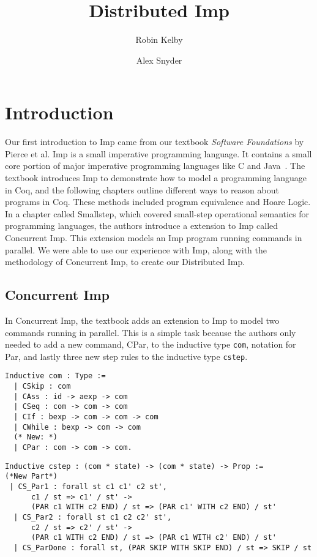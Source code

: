 \documentclass{llncs}
\begin{document}
\title{Distributed Imp}

\author{Robin Kelby \and Alex Snyder}

\maketitle

\section{Introduction}
Our first introduction to Imp came from our textbook \textit{Software Foundations} by Pierce et al. Imp is a small imperative programming language. It contains a small core portion of major imperative programming languages like C and Java~\cite{pierce2016imp}. The textbook introduces Imp to demonstrate how to model a programming language in Coq, and the following chapters outline different ways to reason about programs in Coq. These methods included program equivalence and Hoare Logic. In a chapter called Smallstep, which covered small-step operational semantics for programming languages, the authors introduce a extension to Imp called Concurrent Imp. This extension models an Imp program running commands in parallel. We were able to use our experience with Imp, along with the methodology of Concurrent Imp, to create our Distributed Imp.

\subsection{Concurrent Imp} 
In Concurrent Imp, the textbook adds an extension to Imp to model two commands running in parallel. This is a simple task because the authors only needed to add a new command, CPar, to the inductive type \lstinline|com|, notation for Par, and lastly three new step rules to the inductive type \lstinline|cstep|.  

\begin{lstlisting}
Inductive com : Type :=
  | CSkip : com
  | CAss : id -> aexp -> com
  | CSeq : com -> com -> com
  | CIf : bexp -> com -> com -> com
  | CWhile : bexp -> com -> com
  (* New: *)
  | CPar : com -> com -> com.
\end{lstlisting}

\begin{lstlisting}
Inductive cstep : (com * state) -> (com * state) -> Prop :=
(*New Part*)
 | CS_Par1 : forall st c1 c1' c2 st',
      c1 / st => c1' / st' ->
      (PAR c1 WITH c2 END) / st => (PAR c1' WITH c2 END) / st'
  | CS_Par2 : forall st c1 c2 c2' st',
      c2 / st => c2' / st' ->
      (PAR c1 WITH c2 END) / st => (PAR c1 WITH c2' END) / st'
  | CS_ParDone : forall st, (PAR SKIP WITH SKIP END) / st => SKIP / st
\end{lstlisting}
\end{document}
